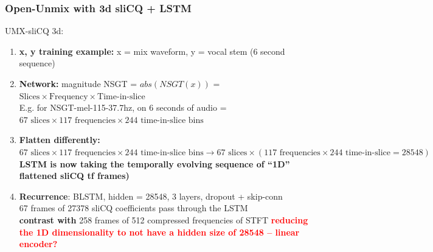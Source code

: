 \documentclass[usenames,dvipsnames]{beamer}
\begin{document}
\begin{frame}
	\frametitle{Open-Unmix with 3d sliCQ + LSTM}
	UMX-sliCQ 3d:
	\begin{enumerate}
		\item
			\textbf{x, y training example:} x = mix waveform, y = vocal stem (6 second sequence)
		\item
			\textbf{Network:} magnitude NSGT = $abs(NSGT(x))$ = $\text{Slices} \times \text{Frequency} \times \text{Time-in-slice}$\\E.g. for NSGT-mel-115-37.7hz, on 6 seconds of audio = $67 \text{ slices} \times 117 \text{ frequencies} \times 244 \text{ time-in-slice bins} $
		\item
			\textbf{Flatten differently:} $67 \text{ slices} \times 117 \text{ frequencies} \times 244 \text{ time-in-slice bins} \rightarrow 67 \text{ slices} \times (117 \text { frequencies} \times 244 \text { time-in-slice} = 28548)$\\
			\textbf{LSTM is now taking the temporally evolving sequence of ``1D'' flattened sliCQ tf frames)}
		\item
			\textbf{Recurrence}: BLSTM, hidden = 28548, 3 layers, dropout + skip-conn\\
			67 frames of 27378 sliCQ coefficients pass through the LSTM\\
			\textbf{contrast with} 258 frames of 512 compressed frequencies of STFT
			\textbf{\textcolor{red}{reducing the 1D dimensionality to not have a hidden size of 28548 -- linear encoder?}}
	\end{enumerate}
\end{frame}
\end{document}
